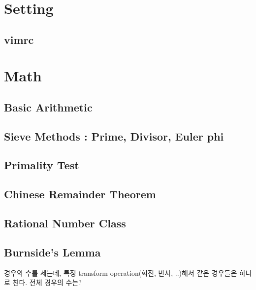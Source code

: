 \documentclass[10pt,landscape,a4paper,twocolumn]{article}
\begin{document}
\tableofcontents


\section{Setting}

\subsection{vimrc}



\section{Math}

\subsection{Basic Arithmetic}


\subsection{Sieve Methods : Prime, Divisor, Euler phi}


\subsection{Primality Test}


\subsection{Chinese Remainder Theorem}


\subsection{Rational Number Class}


\subsection{Burnside's Lemma}

경우의 수를 세는데, 특정 transform operation(회전, 반사, ..)해서 같은 경우들은 하나로 친다.
전체 경우의 수는?
\end{document}
